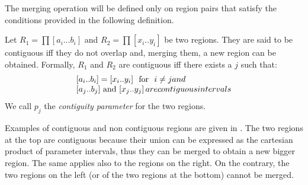 	\begin{figure}[t]
		\begin{center}
		\end{center}
	\end{figure}


The merging operation will be defined only on region pairs that satisfy the conditions provided in the following definition.
\begin{definition}Let $R_{1}=\prod\left[a_{i}\dots b_{i}\right]$ and $R_{2}=\prod\left[x_{i}..y_{i}\right]$
be two regions. They are said to be contiguous iff they do not overlap and, merging them, a new region can be obtained. Formally, $R_1$ and $R_2$ are contiguous iff there exists a $j$ such that:
	\begin{align}\begin{array}{l}
		\left[a_{i}..b_{i}\right]=\left[x_{i}..y_{i}\right]$
	\mbox{ for } $i\neq j \mbox{      and} \\
		\left[a_{j}..b_{j}\right]$ and $\left[x_{j}..y_{j}\right] \mbox{ are contiguous intervals}
	\end{array}\end{align}
\noindent We call $p_j$ the \emph{contiguity parameter} for the two regions.
\end{definition}

Examples of contiguous and non contiguous regions are given in . The two regions at the top are contiguous because their union can be expressed as the cartesian product of parameter intervals, thus they can be merged to obtain a new bigger region. The same applies also to the regions on the right. On the contrary, the two regions on the left (or of the two regions at the bottom) cannot be merged. 

